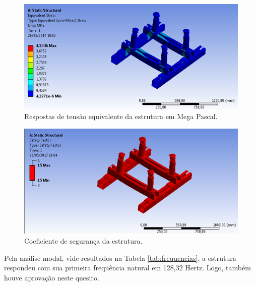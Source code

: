 \begin{figure}[h!]
	\centering
	\includegraphics[keepaspectratio=true,scale= 0.8]{figuras/pascal.png}
	\caption{Respostas de tensão equivalente da estrutura em Mega Pascal.}
	\label{fig:pascal}
\end{figure}

\begin{figure}[h!]
	\centering
	\includegraphics[keepaspectratio=true,scale= 0.8]{figuras/coeficiente-estrutura.png}
	\caption{Coeficiente de segurança da estrutura.}
	\label{fig:coeficienteestrutura}
\end{figure}

\pagebreak

 Pela análise modal, vide resultados na Tabela \ref{tab:frequencias}, a estrutura respondeu com sua primeira frequência natural em 128,32 Hertz. Logo, também houve aprovação neste quesito.


